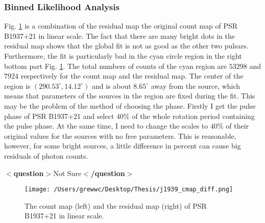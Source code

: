 \documentclass[12pt]{report}
\newcommand{\question}[1]{
  $<$\textbf{question}$>$#1$<$\textbf{/question}$>$
}
\begin{document}
        \subsubsection{Binned Likelihood Analysis}
          Fig. \ref{fig: j1939_count_map_diff} is a combination of the residual map the 
          original count map of PSR B1937+21 in linear scale. The fact that there are many 
          bright dots in the residual map shows that the global fit is not as good as the 
          other two pulsars. Furthermore, the fit is particularly bad in the cyan circle 
          region in the right bottom part Fig. \ref{fig: j1939_count_map_diff}. 
          The total numbers of counts of the cyan region are $53298$ and $7924$ respectively 
          for the count map and the residual map. The center of the region is 
          $\left(290.53^{\circ}, 14.12^{\circ}\right)$ and is about $8.65^{\circ}$ away from 
          the source, which means that parameters of the sources in the region are fixed 
          during the fit. This may be the problem of the method of choosing the phase. 
          Firstly I get the pulse phase of PSR B1937+21 and select $40\%$ of the whole 
          rotation period containing the pulse phase. At the same time, I need to change the 
          scales to $40\%$ of their original values for the sources with no free 
          parameters. This is reasonable, however, for some bright sources, a little 
          difference in percent can cause big residuals of photon counts. 
          \question{Not Sure}

          \begin{figure}
            \texttt{[image: /Users/grewwc/Desktop/Thesis/j1939\_cmap\_diff.png]}
            \caption{The count map (left) and the residual map (right) of PSR B1937+21 in 
              linear scale.}
            \label{fig: j1939_count_map_diff}
          \end{figure}
\end{document}
